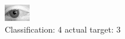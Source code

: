 \begin{figure}[h!]
\begin{center}
\includegraphics[width=0.60\columnwidth]{figures/ID2834_class_4_target_3.png}
\end{center}
\caption{ Classification: 4 actual target: 3}
\label{fig:ID2834_class_4_target_3}
\end{figure}
